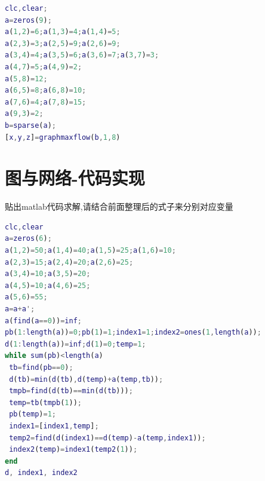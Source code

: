 \documentclass[a4paper,20pt]{article}
\begin{document}
\begin{center}
    \begin{lstlisting}[caption={Example4.m},language=Matlab]
        %This is example4.m
clc,clear;
a=zeros(9);
a(1,2)=6;a(1,3)=4;a(1,4)=5;
a(2,3)=3;a(2,5)=9;a(2,6)=9;
a(3,4)=4;a(3,5)=6;a(3,6)=7;a(3,7)=3;
a(4,7)=5;a(4,9)=2;
a(5,8)=12;
a(6,5)=8;a(6,8)=10;
a(7,6)=4;a(7,8)=15;
a(9,3)=2;
b=sparse(a);
[x,y,z]=graphmaxflow(b,1,8)
        \end{lstlisting}
\end{center}
\section{图与网络-代码实现}
\par 贴出matlab代码求解,请结合前面整理后的式子来分别对应变量
\begin{center}
    \begin{lstlisting}[caption={Picture and Network},language=Matlab]
clc,clear
a=zeros(6);
a(1,2)=50;a(1,4)=40;a(1,5)=25;a(1,6)=10;
a(2,3)=15;a(2,4)=20;a(2,6)=25;
a(3,4)=10;a(3,5)=20;
a(4,5)=10;a(4,6)=25;
a(5,6)=55;
a=a+a';
a(find(a==0))=inf;
pb(1:length(a))=0;pb(1)=1;index1=1;index2=ones(1,length(a));
d(1:length(a))=inf;d(1)=0;temp=1;
while sum(pb)<length(a)
 tb=find(pb==0);
 d(tb)=min(d(tb),d(temp)+a(temp,tb));
 tmpb=find(d(tb)==min(d(tb)));
 temp=tb(tmpb(1));
 pb(temp)=1;
 index1=[index1,temp];
 temp2=find(d(index1)==d(temp)-a(temp,index1));
 index2(temp)=index1(temp2(1));
end
d, index1, index2
        \end{lstlisting}
\end{center}
\end{document}
